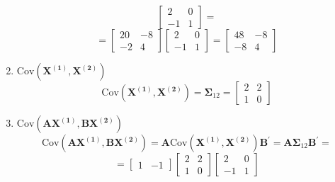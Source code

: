 \begin{enumerate}[label=(\alph*)]
\[\begin{bmatrix}
                    2 & 0 \\
                    -1 & 1
                \end{bmatrix}
                =
            \]
            \[
                =
                \begin{bmatrix}
                    20 & -8 \\
                    -2 & 4
                \end{bmatrix}
                \begin{bmatrix}
                    2 & 0 \\
                    -1 & 1
                \end{bmatrix}
                = 
                \begin{bmatrix}
                    48 & -8 \\
                    -8 & 4
                \end{bmatrix}
            \]
            \item $\text{Cov}\left(\mathbf{X^{(1)}}, \mathbf{X^{(2)}}\right)$
            \[
                \text{Cov}\left(\mathbf{X^{(1)}}, \mathbf{X^{(2)}}\right)
                =
                \mathbf{\Sigma}_{12}
                =
                \begin{bmatrix}
                    2 & 2 \\
                    1 & 0
                \end{bmatrix}
            \]
            \item $\text{Cov}\left(\mathbf{A}\mathbf{X^{(1)}}, \mathbf{B}\mathbf{X^{(2)}}\right)$
            \[
                \text{Cov}\left(\mathbf{A}\mathbf{X^{(1)}}, \mathbf{B}\mathbf{X^{(2)}}\right)
                =
                \mathbf{A}\text{Cov}\left(\mathbf{X^{(1)}}, \mathbf{X^{(2)}}\right)\mathbf{B}^\prime
                =
                \mathbf{A}\mathbf{\Sigma}_{12}\mathbf{B}^\prime
                =
            \]
            \[
                =
                \begin{bmatrix}
                    1 & -1
                \end{bmatrix}
                \begin{bmatrix}
                    2 & 2 \\
                    1 & 0
                \end{bmatrix}
                \begin{bmatrix}
                    2 & 0 \\
                    -1 & 1

\end{bmatrix}\]
\end{enumerate}
